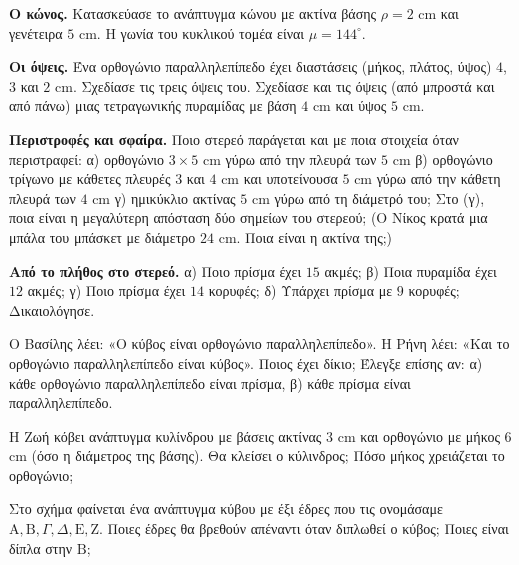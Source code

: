 \ex \textbf{Ο κώνος.} Κατασκεύασε το ανάπτυγμα κώνου με ακτίνα βάσης $\rho=2$ cm και γενέτειρα $5$ cm. Η γωνία του κυκλικού τομέα είναι $\mu=144^\circ$.

\ex \textbf{Οι όψεις.} Ένα ορθογώνιο παραλληλεπίπεδο έχει διαστάσεις (μήκος, πλάτος, ύψος) $4$, $3$ και $2$ cm. Σχεδίασε τις τρεις όψεις του. Σχεδίασε και τις όψεις (από μπροστά και από πάνω) μιας τετραγωνικής πυραμίδας με βάση $4$ cm και ύψος $5$ cm.

\ex \textbf{Περιστροφές και σφαίρα.} Ποιο στερεό παράγεται και με ποια στοιχεία όταν περιστραφεί: α) ορθογώνιο $3\times5$ cm γύρω από την πλευρά των $5$ cm \quad β) ορθογώνιο τρίγωνο με κάθετες πλευρές $3$ και $4$ cm και υποτείνουσα $5$ cm γύρω από την κάθετη πλευρά των $4$ cm \quad γ) ημικύκλιο ακτίνας $5$ cm γύρω από τη διάμετρό του; Στο (γ), ποια είναι η μεγαλύτερη απόσταση δύο σημείων του στερεού; (Ο Νίκος κρατά μια μπάλα του μπάσκετ με διάμετρο $24$ cm. Ποια είναι η ακτίνα της;)


\ex \textbf{Από το πλήθος στο στερεό.} α) Ποιο πρίσμα έχει $15$ ακμές; \quad β) Ποια πυραμίδα έχει $12$ ακμές; \quad γ) Ποιο πρίσμα έχει $14$ κορυφές; \quad δ) Υπάρχει πρίσμα με $9$ κορυφές; Δικαιολόγησε.

\ex Ο Βασίλης λέει: «Ο κύβος είναι ορθογώνιο παραλληλεπίπεδο». Η Ρήνη λέει: «Και το ορθογώνιο παραλληλεπίπεδο είναι κύβος». Ποιος έχει δίκιο; Έλεγξε επίσης αν: α) κάθε ορθογώνιο παραλληλεπίπεδο είναι πρίσμα, β) κάθε πρίσμα είναι παραλληλεπίπεδο.

\ex Η Ζωή κόβει ανάπτυγμα κυλίνδρου με βάσεις ακτίνας $3$ cm και ορθογώνιο με μήκος $6$ cm (όσο η διάμετρος της βάσης). Θα κλείσει ο κύλινδρος; Πόσο μήκος χρειάζεται το ορθογώνιο;

\ex Στο σχήμα φαίνεται ένα ανάπτυγμα κύβου με έξι έδρες που τις ονομάσαμε $\mathrm{Α},\mathrm{Β},\Gamma,\Delta,\mathrm{Ε},\mathrm{Ζ}$. Ποιες έδρες θα βρεθούν απέναντι όταν διπλωθεί ο κύβος; Ποιες είναι δίπλα στην $\mathrm{Β}$;
\begin{center}
\end{center}

